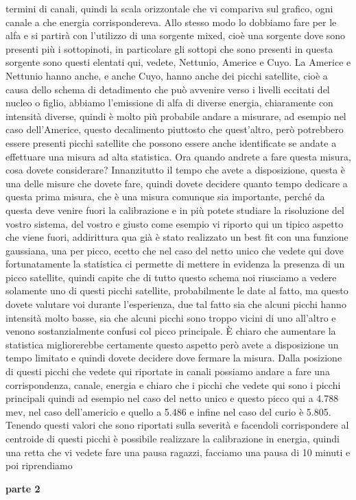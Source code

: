 termini di canali, quindi la scala orizzontale che vi compariva sul grafico, ogni canale a che energia corrispondereva. Allo stesso modo lo dobbiamo fare per le alfa e si partirà con l'utilizzo di una sorgente mixed, cioè una sorgente dove sono presenti più i sottopinoti, in particolare gli sottopi che sono presenti in questa sorgente sono questi elentati qui, vedete, Nettunio, Americe e Cuyo. La Americe e Nettunio hanno anche, e anche Cuyo, hanno anche dei picchi satellite, cioè a causa dello schema di detadimento che può avvenire verso i livelli eccitati del nucleo o figlio, abbiamo l'emissione di alfa di diverse energia, chiaramente con intensità diverse, quindi è molto più probabile andare a misurare, ad esempio nel caso dell'Americe, questo decalimento piuttosto che quest'altro, però potrebbero essere presenti picchi satellite che possono essere anche identificate se andate a effettuare una misura ad alta statistica. Ora quando andrete a fare questa misura, cosa dovete considerare? Innanzitutto il tempo che avete a disposizione, questa è una delle misure che dovete fare, quindi dovete decidere quanto tempo dedicare a questa prima misura, che è una misura comunque sia importante, perché da questa deve venire fuori la calibrazione e in più potete studiare la risoluzione del vostro sistema, del vostro e giusto come esempio vi riporto qui un tipico aspetto che viene fuori, addirittura qua già è stato realizzato un best fit con una funzione gaussiana, una per picco, ecetto che nel caso del netto unico che vedete qui dove fortunatamente la statistica ci permette di mettere in evidenza la presenza di un picco satellite, quindi capite che di tutto questo schema noi riusciamo a vedere solamente uno di questi picchi satellite, probabilmente le date al fatto, ma questo dovete valutare voi durante l'esperienza, due tal fatto sia che alcuni picchi hanno intensità molto basse, sia che alcuni picchi sono troppo vicini di uno all'altro e venono sostanzialmente confusi col picco principale. È chiaro che aumentare la statistica migliorerebbe certamente questo aspetto però avete a disposizione un tempo limitato e quindi dovete decidere dove fermare la misura. Dalla posizione di questi picchi che vedete qui riportate in canali possiamo andare a fare una corrispondenza, canale, energia e chiaro che i picchi che vedete qui sono i picchi principali quindi ad esempio nel caso del netto unico e questo picco qui a 4.788 mev, nel caso dell'americio e quello a 5.486 e infine nel caso del curio è 5.805. Tenendo questi valori che sono riportati sulla severità e facendoli corrispondere al centroide di questi picchi è possibile realizzare la calibrazione in energia, quindi una retta che vi vedete fare una pausa ragazzi, facciamo una pausa di 10 minuti e poi riprendiamo

\textbf{parte 2}